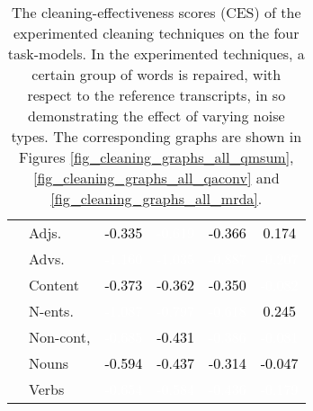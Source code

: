 \begin{table*}[ht]
{\begin{tabular}{c|lc|c|c|c}
    &
    Adjs. &     \cellcolor[gray]{1.00} \textcolor{black}{-0.335} &     \cellcolor[gray]{0.33} \textcolor{white}{-0.619} &     \cellcolor[gray]{0.67} \textcolor{black}{-0.366} &     \cellcolor[gray]{0.83} \textcolor{black}{0.174} \\
    &
    Advs. &     \cellcolor[gray]{0.00} \textcolor{white}{-1.160} &     \cellcolor[gray]{0.00} \textcolor{white}{-1.035} &     \cellcolor[gray]{0.00} \textcolor{white}{-0.887} &     \cellcolor[gray]{0.00} \textcolor{white}{-0.207} \\
    &
    Content &     \cellcolor[gray]{0.83} \textcolor{black}{-0.373} &     \cellcolor[gray]{1.00} \textcolor{black}{-0.362} &     \cellcolor[gray]{0.83} \textcolor{black}{-0.350} &     \cellcolor[gray]{0.33} \textcolor{white}{-0.082} \\
    &
    N-ents. &     \cellcolor[gray]{0.17} \textcolor{white}{-1.087} &     \cellcolor[gray]{0.17} \textcolor{white}{-0.797} &     \cellcolor[gray]{0.17} \textcolor{white}{-0.618} &     \cellcolor[gray]{1.00} \textcolor{black}{0.245} \\
    &
    Non-cont, &     \cellcolor[gray]{0.33} \textcolor{white}{-0.685} &     \cellcolor[gray]{0.83} \textcolor{black}{-0.431} &     \cellcolor[gray]{0.50} \textcolor{white}{-0.386} &     \cellcolor[gray]{0.50} \textcolor{white}{-0.081} \\
    &
    Nouns &     \cellcolor[gray]{0.67} \textcolor{black}{-0.594} &     \cellcolor[gray]{0.67} \textcolor{black}{-0.437} &     \cellcolor[gray]{1.00} \textcolor{black}{-0.314} &     \cellcolor[gray]{0.67} \textcolor{black}{-0.047} \\
    &
    Verbs &     \cellcolor[gray]{0.50} \textcolor{white}{-0.654} &     \cellcolor[gray]{0.50} \textcolor{white}{-0.584} &     \cellcolor[gray]{0.33} \textcolor{white}{-0.436} &     \cellcolor[gray]{0.17} \textcolor{white}{-0.179} \\
    \bottomrule
    \end{tabular}%
    }
    \caption{The cleaning-effectiveness scores (CES) of the experimented cleaning techniques on the four task-models. In the experimented techniques, a certain group of words is repaired, with respect to the reference transcripts, in so demonstrating the effect of varying noise types. The corresponding graphs are shown in Figures \ref{fig_cleaning_graphs_all_qmsum}, \ref{fig_cleaning_graphs_all_qaconv} and \ref{fig_cleaning_graphs_all_mrda}.}
    \label{tab_scores_cleaning_all}
\end{table*}